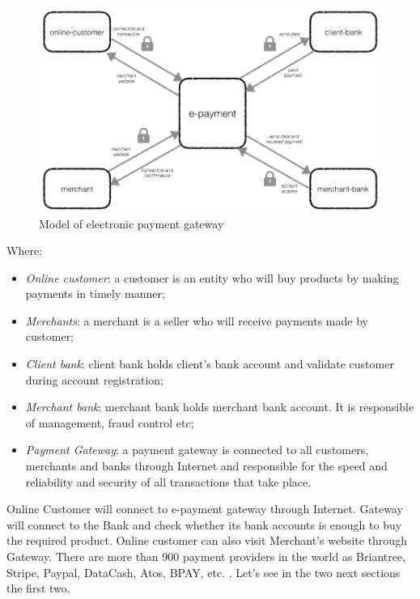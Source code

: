 \begin{figure}[htb]
\centering
\includegraphics[width=1.0\linewidth]{images/chapter2/payment_model.png}\hfill
\caption[Model of electronic payment gateway]{Model of electronic payment gateway}
\label{fig:model_payment_gateway}
\end{figure}
Where:
\begin{itemize}
\item \emph{Online customer}: a customer is an entity who will buy products by
making payments in timely manner;
\item \emph{Merchants}: a merchant is a seller who will receive payments made by customer;
\item \emph{Client bank}: client bank holds client’s bank account and validate customer during account registration;
\item \emph{Merchant bank}: merchant bank holds merchant bank account. It is responsible of management, fraud control etc;
\item \emph{Payment Gateway}: a payment gateway is connected to all customers, merchants and banks through Internet and responsible for the speed and reliability and security of all transactions that take place.
\end{itemize}
Online Customer will connect to e-payment gateway through Internet. Gateway will connect to the Bank and check whether its bank accounts is enough to buy the required product. Online customer can also visit Merchant’s website through Gateway.
\newline
There are more than 900 payment providers in the world as Briantree, Stripe, Paypal, DataCash, Atos, BPAY, etc. \cite{payment_service_provider}.
\newline
Let's see in the two next sections the first two.